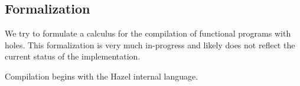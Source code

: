 \documentclass[index.tex]{subfiles}
\begin{document}
\subsection{Formalization}
\label{formalization}
We try to formulate a calculus for the compilation of functional programs with holes. This
formalization is very much in-progress and likely does not reflect the current status of the
implementation.

Compilation begins with the Hazel internal language.


\end{document}
